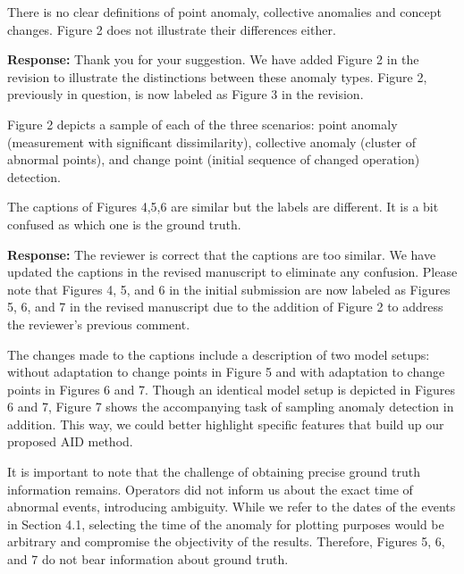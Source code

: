 \documentclass{article}
\makeatletter
\newenvironment{comment}{
\begin{sloppypar}\slshape
\vspace{5 mm}
\color{blue}
 \@beginparpenalty\@M
  \begin{list}{}{\setlength{\topsep}{0ex}%
  \setlength{\leftmargin}{\rightmargin}}\item[]
 \@beginparpenalty\@endparpenalty
}
{\end{list}
\end{sloppypar}
}
\makeatother
\begin{document}
\begin{enumerate}

  \item
        \begin{comment}
        There is no clear definitions of point anomaly, collective anomalies and concept changes. Figure 2 does not illustrate their differences either.
        \end{comment}
        {\bf Response:}
        Thank you for your suggestion. We have added Figure 2 in the revision to illustrate the distinctions between these anomaly types. Figure 2, previously in question, is now labeled as Figure 3 in the revision.

        Figure 2 depicts a sample of each of the three scenarios: point anomaly (measurement with significant dissimilarity), collective anomaly (cluster of abnormal points), and change point (initial sequence of changed operation) detection. 

  \item
        \begin{comment}
        The captions of Figures 4,5,6 are similar but the labels are different. It is a bit confused as which one is the ground truth.
        \end{comment}
        {\bf Response:}
        The reviewer is correct that the captions are too similar. We have updated the captions in the revised manuscript to eliminate any confusion. Please note that Figures 4, 5, and 6 in the initial submission are now labeled as Figures 5, 6, and 7 in the revised manuscript due to the addition of Figure 2 to address the reviewer's previous comment.

        The changes made to the captions include a description of two model setups: without adaptation to change points in Figure 5 and with adaptation to change points in Figures 6 and 7. Though an identical model setup is depicted in Figures 6 and 7, Figure 7 shows the accompanying task of sampling anomaly detection in addition. This way, we could better highlight specific features that build up our proposed AID method.

        It is important to note that the challenge of obtaining precise ground truth information remains. Operators did not inform us about the exact time of abnormal events, introducing ambiguity. While we refer to the dates of the events in Section 4.1, selecting the time of the anomaly for plotting purposes would be arbitrary and compromise the objectivity of the results. Therefore, Figures 5, 6, and 7 do not bear information about ground truth.


\end{enumerate}
\end{document}
